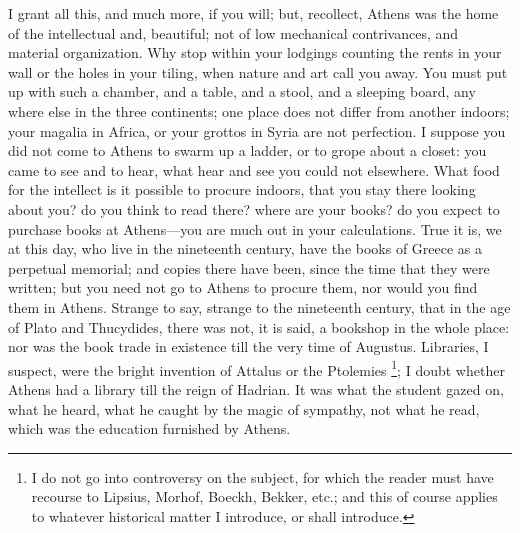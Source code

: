 I grant all this, and much more, if you will; but, recollect,
Athens was the home of the intellectual and, beautiful; not of low
mechanical contrivances, and material organization. Why stop within
your lodgings counting the rents in your wall or the holes in your
tiling, when nature and art call you away. You must put up with such a
chamber, and a table, and a stool, and a sleeping board, any where
else in the three continents; one place does not differ from another
indoors; your magalia in Africa, or your grottos in Syria are not
perfection. I suppose you did not come to Athens to swarm up a ladder,
or to grope about a closet: you came to see and to hear, what hear and
see you could not elsewhere. What food for the intellect is it
possible to procure indoors, that you stay there looking about you? do
you think to read there? where are your books? do you expect to
purchase books at Athens—you are much out in your calculations. True
it is, we at this day, who live in the nineteenth century, have the
books of Greece as a perpetual memorial; and copies there have been,
since the time that they were written; but you need not go to Athens
to procure them, nor would you find them in Athens. Strange to say,
strange to the nineteenth century, that in the age of Plato and
Thucydides, there was not, it is said, a bookshop in the whole place:
nor was the book trade in existence till the very time of Augustus.
Libraries, I suspect, were the bright invention of Attalus or the
Ptolemies \footnote{I do not go
into controversy on the subject, for which the reader must have
recourse to Lipsius, Morhof, Boeckh, Bekker, etc.; and this of course
applies to whatever historical matter I introduce, or shall introduce.}; I doubt
whether Athens had a library till the reign of Hadrian. It was what
the student gazed on, what he heard, what he caught by the magic of
sympathy, not what he read, which was the education furnished by
Athens.


